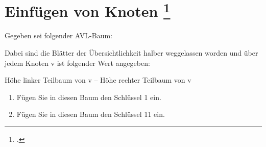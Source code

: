 \documentclass{lehramt-informatik-aufgabe}
\begin{document}

\section{Einfügen von Knoten
\footcite[Seite 3, Aufgabe 5: AVL-Baum]{aud:ab:7}}

Gegeben sei folgender AVL-Baum:

Dabei sind die Blätter der Übersichtlichkeit halber weggelassen worden
und über jedem Knoten v ist folgender Wert angegeben:

\begin{center}
Höhe linker Teilbaum von v – Höhe rechter Teilbaum von v
\end{center}

\begin{enumerate}


\item Fügen Sie in diesen Baum den Schlüssel 1 ein.


\item Fügen Sie in diesen Baum den Schlüssel 11 ein.

\end{enumerate}
\end{document}
